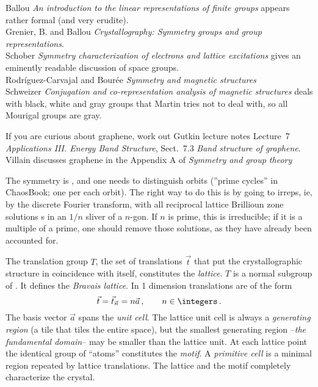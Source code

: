 \noindent
Ballou {\em An introduction to the linear representations of
finite groups} appears rather formal (and very erudite).
\\
Grenier, B. and Ballou
{\em Crystallography: {Symmetry} groups and group representations}.
\\
Schober {\em Symmetry characterization of electrons and lattice
excitations} gives an eminently readable discussion of space groups.
\\
Rodr{\'i}guez-Carvajal and Bour{\'e}e
{\em Symmetry and magnetic structures}
\\
Schweizer
{\em Conjugation and co-representation analysis of magnetic structures}
deals with black, white and gray groups that Martin tries not to deal with,
so all Mourigal groups are gray.

If you are curious about graphene, work out Gutkin
 {lecture
notes} Lecture~7 {\em Applications III. Energy Band Structure}, Sect.~7.3
{\em Band structure of graphene}.
Villain discusses graphene in the Appendix A of {\em Symmetry and group theory}

\bigskip

The symmetry is
, and one needs to distinguish  orbits
(''{prime cycle}s'' in ChaosBook; one per each orbit).
The right way to do this is by going to
 irreps, ie, by the discrete Fourier transform, with all reciprocal
lattice Brillioun zone solutions {\orbit}s in an $1/n$ sliver of a
$n$-gon. If $n$ is prime, this is irreducible; if it is a multiple of a
prime, one should remove those solutions, as they have already been
accounted for.

The translation group $T$, the set of translations $\vec{t}$ that put the
crystallographic structure in coincidence with itself, constitutes the
\emph{lattice}. $T$ is a normal subgroup of \Group. It defines the
\emph{Bravais lattice}. In 1 dimension translations are of the form
\[
\vec{t} = \vec{t}_{\vec{n}} = n  \vec{a}
\,,\qquad
n\in \integers
\,.
\]
The basis vector $\vec{a}$ spans the \emph{unit cell}.
The lattice unit cell is always a \emph{generating region} (a tile that tiles
the entire space), but the smallest generating region --\emph{the fundamental
domain}-- may be smaller than the lattice unit. At each lattice point the
identical group of ``atoms'' constitutes the \emph{motif}.
A \emph{primitive cell} is a minimal region repeated by lattice translations.
The lattice and the motif completely characterize the crystal.

